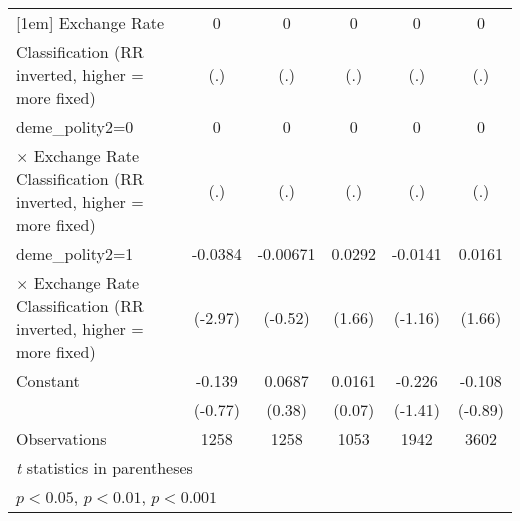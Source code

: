 {\begin{tabular}{l*{5}{c}}
[1em]
Exchange Rate       &           0         &           0         &           0         &           0         &           0         \\
Classification (RR inverted, higher = more fixed)&         (.)         &         (.)         &         (.)         &         (.)         &         (.)         \\
[1em]
deme\_polity2=0      &           0         &           0         &           0         &           0         &           0         \\
$\times$ Exchange Rate Classification (RR inverted, higher = more fixed)&         (.)         &         (.)         &         (.)         &         (.)         &         (.)         \\
[1em]
deme\_polity2=1      &     -0.0384\sym{**} &    -0.00671         &      0.0292         &     -0.0141         &      0.0161         \\
$\times$ Exchange Rate Classification (RR inverted, higher = more fixed)&     (-2.97)         &     (-0.52)         &      (1.66)         &     (-1.16)         &      (1.66)         \\
[1em]
Constant            &      -0.139         &      0.0687         &      0.0161         &      -0.226         &      -0.108         \\
                    &     (-0.77)         &      (0.38)         &      (0.07)         &     (-1.41)         &     (-0.89)         \\
\hline
Observations        &        1258         &        1258         &        1053         &        1942         &        3602         \\
\hline\hline
\multicolumn{6}{l}{\footnotesize \textit{t} statistics in parentheses}\\
\multicolumn{6}{l}{\footnotesize \sym{*} \(p<0.05\), \sym{**} \(p<0.01\), \sym{***} \(p<0.001\)}\\
\end{tabular}
}
